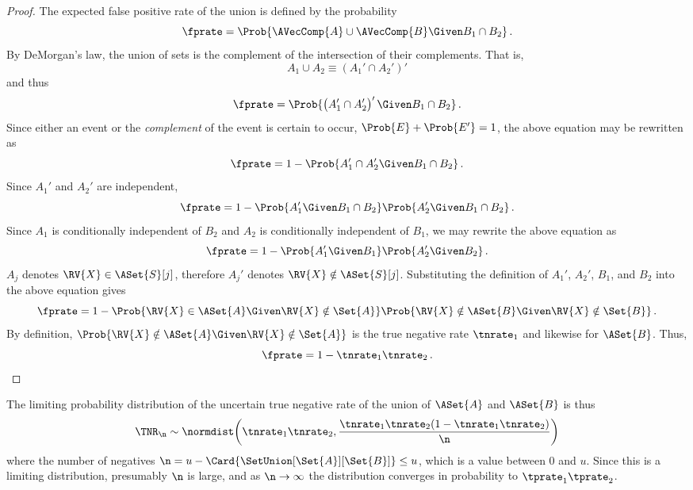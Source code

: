 \documentclass[ ../main.tex]{subfiles}
\begin{document}
\begin{proof}
	The expected false positive rate of the union is defined by the probability
	\begin{equation}
	\fprate = \Prob{\AVecComp{A} \cup \AVecComp{B} \Given B_1 \cap B_2}\,.
	\end{equation}
	By DeMorgan's law, the union of sets is the complement of the intersection of their complements. That is,
	\begin{equation}
	\label{eq:proof_union_fp_1}
	A_1 \cup A_2 \equiv \left(A_1' \cap A_2'\right)'
	\end{equation}
	and thus
	\begin{equation}
	\label{eq:proof_union_fp_2}
	\fprate = \Prob{\left(A_1' \cap A_2'\right)' \Given B_1 \cap B_2}\,.
	\end{equation}
	Since either an event or the \emph{complement} of the event is certain to occur, $\Prob{E} + \Prob{E'} = 1$, the above equation may be rewritten as
	\begin{equation}
	\label{eq:proof_union_fp_3}
	\fprate = 1 - \Prob{A_1' \cap A_2' \Given B_1 \cap B_2}\,.
	\end{equation}
	Since $A_1'$ and $A_2'$ are independent,
	\begin{equation}
	\fprate = 1 - \Prob{A_1' \Given B_1 \cap B_2} \Prob{A_2' \Given B_1 \cap 
		B_2}\,.
	\end{equation}
	Since $A_1$ is conditionally independent of $B_2$ and $A_2$ is conditionally independent of $B_1$, we may rewrite the above equation as
	\begin{equation}
	\fprate = 1 - \Prob{A_1' \Given B_1} \Prob{A_2' \Given B_2}\,.
	\end{equation}
	$A_j$ denotes $\RV{X} \in \ASet{S}[j]$, therefore $A_j'$ denotes $\RV{X} \notin \ASet{S}[j]$. Substituting the definition of $A_1'$, $A_2'$, $B_1$, and $B_2$ into the above equation gives
	\begin{equation}
	\fprate = 1 - \Prob{\RV{X} \in \ASet{A} \Given \RV{X} \notin \Set{A}} 
	\Prob{\RV{X} \notin \ASet{B} \Given \RV{X} \notin \Set{B}}\,.
	\end{equation}
	By definition, $\Prob{\RV{X} \notin \ASet{A} \Given \RV{X} \notin 
		\Set{A}}$ is the true negative rate $\tnrate_1$ and likewise for $\ASet{B}$. Thus,
	\begin{equation}
	\fprate = 1 - \tnrate_1\tnrate_2\,.
	\end{equation}
\end{proof}

The limiting probability distribution of the uncertain true negative rate of the union of $\ASet{A}$ and $\ASet{B}$ is thus
\begin{equation}
\TNR_\n \sim \normdist\!\left(\tnrate_1 \tnrate_2, \frac{\tnrate_1 \tnrate_2 (1-\tnrate_1 \tnrate_2)}{\n}\right)
\end{equation}
where the number of negatives $\n = u - \Card{\SetUnion[\Set{A}][\Set{B}]} \leq u$, which is a value between $0$ and $u$. Since this is a limiting distribution, presumably $\n$ is large, and as $\n \to \infty$ the distribution converges in probability to $\tprate_1 \tprate_2$.  %
\end{document}
